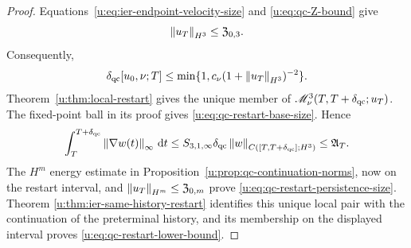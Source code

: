 \begin{proof}
Equations~\eqref{u:eq:ier-endpoint-velocity-size} and
\eqref{u:eq:qc-Z-bound} give
\[
 \left\lVert u_T\right\rVert_{H^3}\le\mathfrak Z_{0,3}.
\]
Consequently,
\[
 \delta_{\rm qc}[u_0,\nu;T]
 \le\min\{1,c_\nu(1+\left\lVert u_T\right\rVert_{H^3})^{-2}\}.
\]
Theorem~\ref{u:thm:local-restart} gives the unique member of
\(\mathscr M_\nu^3(T,T+\delta_{\rm qc};u_T)\).  The fixed-point ball in its
proof gives
\eqref{u:eq:qc-restart-base-size}.  Hence
\[
 \int_T^{T+\delta_{\rm qc}}\left\lVert \nabla w(t)\right\rVert_\infty\,\mathrm d t
 \le S_{3,1,\infty}\delta_{\rm qc}
 \left\lVert w\right\rVert_{C([T,T+\delta_{\rm qc}];H^3)}
 \le\mathfrak A_T.
\]
The \(H^m\) energy estimate in
Proposition~\ref{u:prop:qc-continuation-norms}, now on the restart interval,
and \(\left\lVert u_T\right\rVert_{H^m}\le\mathfrak Z_{0,m}\) prove
\eqref{u:eq:qc-restart-persistence-size}.  Theorem
\ref{u:thm:ier-same-history-restart} identifies this unique local pair with the
continuation of the preterminal history, and its membership on the displayed
interval proves \eqref{u:eq:qc-restart-lower-bound}.
\end{proof}

